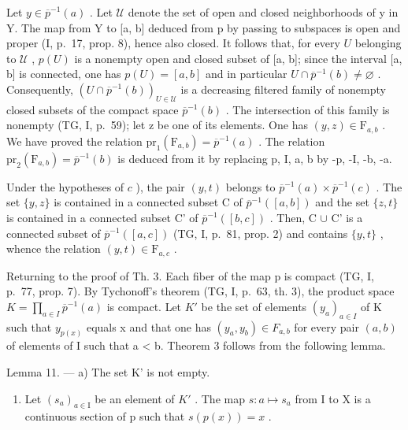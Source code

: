 Let \(y \in \overline{p}^{-1}(a)\) . Let \(\mathcal{U}\) denote the set of open and closed neighborhoods of y in Y. The map from Y to {[}a, b{]} deduced from p by passing to subspaces is open and proper (I, p.~17, prop. 8), hence also closed. It follows that, for every \(U\) belonging to \(\mathcal{U}\) , \(p(U)\) is a nonempty open and closed subset of {[}a, b{]}; since the interval {[}a, b{]} is connected, one has \(p(U) = [a, b]\) and in particular \(U \cap \overline{p}^{-1}(b) \neq \varnothing\) . Consequently, \((U \cap \overline{p}^{-1}(b))_{U \in \mathcal{U}}\) is a decreasing filtered family of nonempty closed subsets of the compact space \(\overline{p}^{-1}(b)\) . The intersection of this family is nonempty (TG, I, p.~59); let z be one of its elements. One has \((y, z) \in \mathrm{F}_{a,b}\) . We have proved the relation \(\mathrm{pr}_{1}(\mathrm{F}_{a,b}) = \overline{p}^{-1}(a)\) . The relation \(\mathrm{pr}_{2}(\mathrm{F}_{a,b}) = \overline{p}^{-1}(b)\) is deduced from it by replacing p, I, a, b by -p, -I, -b, -a.

Under the hypotheses of \(c\) ), the pair \((y,t)\) belongs to \(\overline{p}^{-1}(a)\times\overline{p}^{-1}(c)\) . The set \(\{y,z\}\) is contained in a connected subset C of \(\overline{p}^{-1}([a,b])\) and the set \(\{z,t\}\) is contained in a connected subset C' of \(\overline{p}^{-1}([b,c])\) . Then, C \(\cup\) C' is a connected subset of \(\overline{p}^{-1}([a,c])\) (TG, I, p.~81, prop. 2) and contains \(\{y,t\}\) , whence the relation \((y,t)\in\mathrm{F}_{a,c}\) .

Returning to the proof of Th. 3. Each fiber of the map p is compact (TG, I, p.~77, prop. 7). By Tychonoff's theorem (TG, I, p.~63, th. 3), the product space \(K = \prod_{a \in I} \overline{p}^{-1}(a)\) is compact. Let \(K'\) be the set of elements \((y_{a})_{a \in I}\) of K such that \(y_{p(x)}\) equals x and that one has \((y_{a}, y_{b}) \in F_{a,b}\) for every pair \((a, b)\) of elements of I such that a \textless{} b. Theorem 3 follows from the following lemma.

Lemma 11. --- a) The set K' is not empty.

\begin{enumerate}
\def\labelenumi{\alph{enumi})}
\setcounter{enumi}{1}
\tightlist
\item
  Let \((s_{a})_{a\in\mathrm{I}}\) be an element of \(K'\) . The map \(s\colon a\mapsto s_{a}\) from I to X is a continuous section of p such that \(s(p(x))=x\) .
\end{enumerate}

